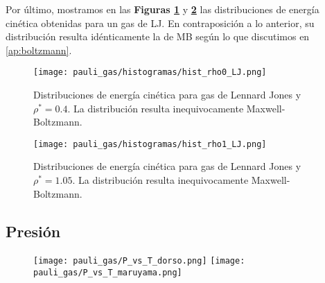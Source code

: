 
Por último, mostramos en las \textbf{Figuras \ref{fig:hist_rho0_LJ}} y \textbf{\ref{fig:hist_rho1_LJ}} las distribuciones de energía cinética obtenidas para un gas de LJ.
En contraposición a lo anterior, su distribución resulta idénticamente la de MB según lo que discutimos en \ref{ap:boltzmann}.

\begin{figure}[H]
	\centering
	\texttt{[image: pauli\_gas/histogramas/hist\_rho0\_LJ.png]}
	\caption{Distribuciones de energía cinética para gas de Lennard Jones y $\rho^* = 0.4$.
	La distribución resulta inequivocamente Maxwell-Boltzmann.}
	\label{fig:hist_rho0_LJ}
\end{figure}

\begin{figure}[H]
	\centering
	\texttt{[image: pauli\_gas/histogramas/hist\_rho1\_LJ.png]}
	\caption{Distribuciones de energía cinética para gas de Lennard Jones y $\rho^* = 1.05$.
	La distribución resulta inequivocamente Maxwell-Boltzmann.}
	\label{fig:hist_rho1_LJ}
\end{figure}




\subsection{Presión}

\begin{figure}[H]
	\centering	%
	\texttt{[image: pauli\_gas/P\_vs\_T\_dorso.png]}
	\texttt{[image: pauli\_gas/P\_vs\_T\_maruyama.png]}
	\caption{}
	\label{fig:PvsT_sim}
\end{figure}